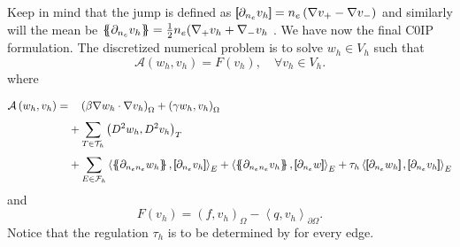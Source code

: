 



Keep in mind that the jump is defined as $\left[\!\!\left[  \partial _{n_e} v _{h}  \right]\!\!\right] = n_{e} \left( \nabla v_{+} - \nabla v_{-}
\right)   $ and similarly will the mean be $\left\{\!\!\left\{ \partial_{  n_{e} } v_{h}  \right\}\!\!\right\} = \frac{1}{2}n_{e}(   \nabla _{+ }v_{h}
+ \nabla _{-} v_{h}$ . We have now the final C0IP formulation.
The discretized numerical problem is to solve $w_{h} \in V_{h}$ such that \[
\mathcal{A}\left( w_{h}, v_{h} \right)   = F\left( v_{h} \right), \quad \forall v_{h} \in V_{h}  .
\]
where

\begin{equation}
\label{eq:basic_dg_A_h}
\begin{split}
\mathcal{A} \left( w_{h}, v_{h} \right)   =&
  \quad  \left( \beta \nabla w_{h} \cdot \nabla v_{h}  \right)_{\Omega } + \left( \gamma w_{h}, v_{h} \right) _{\Omega }\\
&  + \sum_{T \in \mathcal{T} _{h}}^{} \left( D^2 w_{h}, D^2v_{h} \right) _{T} \\
 & +
  \sum_{E \in \mathcal{F}_{h} }^{} \left<\mean{  \partial _{n_{e} n_{e}} w_{h} }, \jump{ \partial _{n_{e}} v_{h}}
\right>_{E}  + \left< \mean{ \partial _{n_{e} n_{e}} v_{h} }, \jump{ \partial _{n_{e}}w }      \right>_{E} + \tau _{h} \left< \jump{ \partial _{n_{e}} w_{h}}, \jump{ \partial _{n_{e}} v_{h}   }   \right>_{E} \\
\end{split}
\end{equation}
and
\begin{equation}
\label{eq:basic_dg_F_h}
F\left( v_{h} \right)  = \left( f, v_{h} \right) _{\Omega } - \left<q, v_{h} \right> _{\partial \Omega }.
\end{equation}
Notice that the regulation $\tau _{h}$ is to be determined by for every edge.

